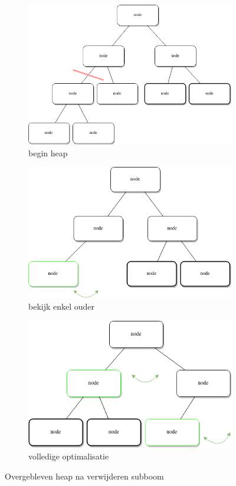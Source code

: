 \documentclass[10pt,a4paper,twoside]{article}
\begin{document}
\\\\
\begin{figure}[h]
\begin{subfigure}{0.34\textwidth}
\includegraphics[width=0.9\linewidth]{figures/skewheap.drawio.png}
\caption{begin heap}
\label{fig:beginHeap}
\end{subfigure}
\begin{subfigure}{0.34\textwidth}
\includegraphics[width=0.9\linewidth]{figures/skewheapNoOpt.drawio.png}
\caption{bekijk enkel ouder}
\label{fig:noOpt}
\end{subfigure}
\begin{subfigure}{0.34\textwidth}
\includegraphics[width=0.9\linewidth]{figures/skewheapOpt.drawio.png}
\caption{volledige optimalisatie}
\label{fig:Opt}
\end{subfigure}
\caption{Overgebleven heap na verwijderen subboom}
\end{figure}
\end{document}
